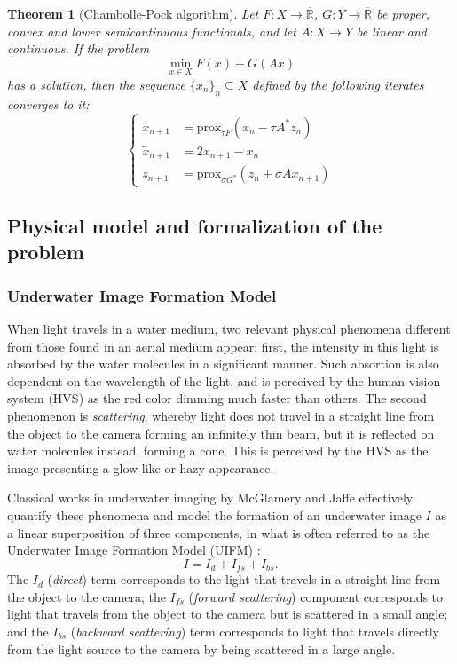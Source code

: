 \documentclass[twocolumn,twoside,a4paper,10pt]{IEEEtran}
\newtheorem{theorem}{Theorem}
\begin{document}
\begin{theorem}[Chambolle-Pock algorithm]\label{thm:chambolle-pock}
  Let \(F\colon X\to\overline{\mathbb{R}}\), \(G\colon Y\to\overline{\mathbb{R}}\) be proper, convex and lower semicontinuous functionals, and let \(A\colon X\to Y\) be linear and continuous. If the problem
  \[
    \min_{x\in X}F(x) + G(Ax)
  \]
  has a solution, then the sequence \(\{x_n\}_n\subseteq X\) defined by the following iterates converges to it:
  \begin{equation}\label{eq:iterates}
    \left\{
    \begin{split}
      x_{n+1} & = \text{prox}_{\tau F}(x_n - \tau A^*z_n) \\
      \tilde{x}_{n+1} & = 2x_{n+1} - x_n \\
      z_{n+1} & = \text{prox}_{\sigma G^*}(z_n + \sigma A\tilde{x}_{n+1})
    \end{split}
    \right.
  \end{equation}
\end{theorem}

\subsection{Physical model and formalization of the problem} \label{subsec:physical-model}
\subsubsection{Underwater Image Formation Model}
When light travels in a water medium, two relevant physical phenomena different from those found in an aerial medium appear: first, the intensity in this light
is absorbed by the water molecules in a significant manner. Such absortion is
also dependent on the wavelength of the light, and is perceived by the human vision system (HVS) as 
the red color dimming much faster than others. The second phenomenon is
\textit{scattering}, whereby light does not travel in a straight line from the
object to the camera forming an infinitely thin beam, but it is reflected on water molecules instead, forming a cone. This is perceived by the HVS as the image
presenting a glow-like or hazy appearance.

Classical works in underwater imaging by McGlamery \cite{10.1117/12.958279} and Jaffe \cite{50695} effectively quantify these phenomena and model the formation of an underwater image \(I\) as a linear superposition of three components, in what is often referred to as the Underwater Image Formation Model (UIFM) \cite{xie2021variational}:
\[
  I = I_{d} + I_{fs} + I_{bs}
.\]
The \(I_d\) (\textit{direct}) term corresponds to the light that travels in a straight line from the object to the camera; the \(I_{fs}\) (\textit{forward scattering}) component corresponds to light that travels from the object to the camera but is scattered in a small angle; and the \(I_{bs}\) (\textit{backward scattering}) term corresponds to light that travels directly from the light source to the camera by being scattered in a large angle.
\end{document}
